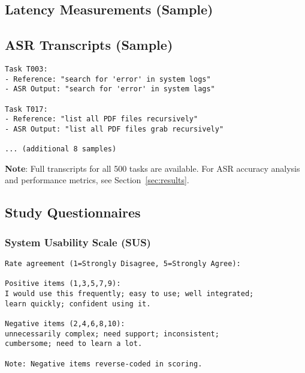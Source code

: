 \documentclass[a4paper,12pt]{article}
\begin{document}
\subsection{Latency Measurements (Sample)}
\begin{table}[h!]
\centering
{}
\caption{Sample of 10 latency measurements from the study (full dataset available in supplementary materials). For comprehensive latency analysis and breakdown, see Section~\ref{sec:results}.}
\end{table}

\subsection{ASR Transcripts (Sample)}
\begin{verbatim}
Task T003: 
- Reference: "search for 'error' in system logs"
- ASR Output: "search for 'error' in system lags"

Task T017: 
- Reference: "list all PDF files recursively"
- ASR Output: "list all PDF files grab recursively"

... (additional 8 samples)
\end{verbatim}
\noindent \textbf{Note}: Full transcripts for all 500 tasks are available. For ASR accuracy analysis and performance metrics, see Section~\ref{sec:results}.

\subsection{Study Questionnaires}
\subsubsection{System Usability Scale (SUS)}
\begin{verbatim}
Rate agreement (1=Strongly Disagree, 5=Strongly Agree):

Positive items (1,3,5,7,9): 
I would use this frequently; easy to use; well integrated; 
learn quickly; confident using it.

Negative items (2,4,6,8,10): 
unnecessarily complex; need support; inconsistent; 
cumbersome; need to learn a lot.

Note: Negative items reverse-coded in scoring.
\end{verbatim}
\end{document}
